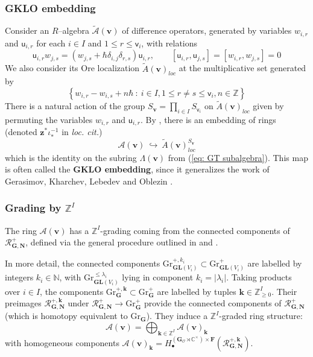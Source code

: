 \documentclass[11pt,reqno]{amsart}
\renewcommand{\mathbf}{\mathbold}
\numberwithin{equation}{section}
\theoremstyle{definition}
\newcommand{\cA}{\mathcal{A}}
\newcommand{\bF}{\mathbf{F}}
\newcommand{\bG}{\mathbf{G}}
\newcommand{\bN}{\mathbf{N}}
\newcommand{\cO}{\mathcal{O}}
\newcommand{\cR}{\mathcal{R}}
\newcommand{\bk}{\mathbf{k}}
\newcommand{\bv}{\mathbf{v}}
\newcommand{\bz}{\mathbf{z}}
\newcommand{\CC}{\mathbb{C}}
\newcommand{\NN}{\mathbb{N}}
\newcommand{\ZZ}{\mathbb{Z}}
\renewcommand{\tilde}[1]{\widetilde{#1}}
\newcommand{\GL}{\mathbf{GL}}
\newcommand{\Gr}{\mathrm{Gr}}
\renewcommand{\bv}{\mathbf{v}} %
\newcommand{\sv}{\mathsf{v}}
\newcommand{\sfu}{\mathsf{u}}
\newcommand{\vertexset}{I}
\newcommand{\GT}{\Lambda}
\newcommand{\base}{R}
\newcommand{\qzast}{\cA}
\newcommand{\GKLO}[1]{\tilde{A}(#1)_{loc}}
\begin{document}
\subsubsection{GKLO embedding}
\label{ssec: GKLO embedding}
Consider an $\base$--algebra $\widetilde{\cA}(\bv)$ of difference operators, generated by variables $w_{i,r}$ and $\sfu_{i,r}$ for each $i \in \vertexset$ and $1 \leq r\leq \sv_i$, with relations
$$
\sfu_{i,r} w_{j,s} = (w_{j,s} + \hbar \delta_{i,j} \delta_{r,s}) \sfu_{i,r}, \qquad [\sfu_{i,r}, \sfu_{j,s}] = [w_{i,r}, w_{j,s}] = 0
$$
We also consider its Ore localization $\GKLO{\bv}$ at the multiplicative set generated by
$$
\left\{ w_{i,r} - w_{i,s} + n \hbar \ : \ i \in \vertexset, 1 \leq r \neq s \leq \sv_i, n \in \ZZ \right\}
$$
There is a natural action of the group $S_{\bv} =\prod_{i \in \vertexset} S_{\sv_i}$ on $\GKLO{\bv}$ given by permuting the variables $w_{i,r}$ and $\sfu_{i,r}$.
By \cite[\S 5]{BFN1}, there is an embedding of rings (denoted $\bz^\ast \iota_\ast^{-1}$ in \emph{loc. cit.}) 
\begin{equation}
\label{eq: GKLO}
\qzast(\bv) \ \hookrightarrow \ \GKLO{\bv}^{S_{\bv}}
\end{equation}
which is the identity on the subring $\GT(\bv)$ from (\ref{eq: GT subalgebra}). This map is often called the \textbf{GKLO embedding}, since it generalizes the work of Gerasimov, Kharchev, Lebedev and Oblezin \cite{GKLO}.

\subsubsection{Grading by $\ZZ^\vertexset$}
\label{ssec: gradings 0}


The ring $\qzast(\bv)$ has a $\ZZ^\vertexset$-grading coming from the connected components of $\cR^+_{\bG,\bN}$, defined via the general procedure outlined in \cite[\S 3(v)]{BFN1} and  \cite[Remark 3.2]{BFN2}.  

In more detail, the connected components $\Gr_{\GL(V_i)}^{+,k_i} \subset \Gr_{\GL(V_i)}^+$ are labelled by integers $k_i \in \NN$, with $\Gr^{\leq \lambda_i}_{\GL(V_i)}$ lying in component $k_i = |\lambda_i|$.  Taking products over $i \in \vertexset$, the components $\Gr_{\bG}^{+, \bk} \subset \Gr_\bG^+$ are labelled by tuples $\bk \in \ZZ^{\vertexset}_{\geq 0}$. Their preimages $\cR^{+,\bk}_{\bG,\bN}$ under $\cR^+_{\bG,\bN} \rightarrow \Gr^+_{\bG}$ provide the connected components of $\cR^+_{\bG,\bN}$ (which is homotopy equivalent to $\Gr_\bG$).  They induce  a $\ZZ^\vertexset$-graded ring structure:
\begin{equation}
    \label{eq: Z^I grading}
    \qzast(\bv) = \bigoplus_{\bk \in \ZZ^\vertexset} \qzast(\bv)_\bk
\end{equation}
with homogeneous components $\qzast(\bv)_\bk = H_\bullet^{(\bG_\cO \rtimes \CC^\times)\times \bF} (\cR^{+,\bk}_{\bG,\bN})$.
\end{document}
